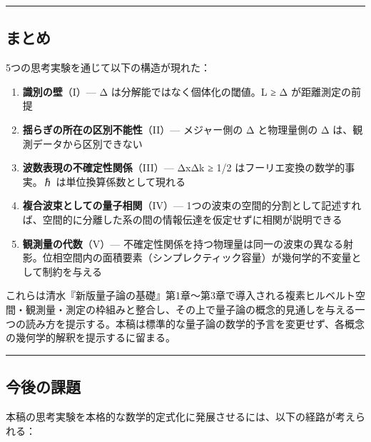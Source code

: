 \documentclass[
  11pt,
]{ltjsarticle}
\providecommand{\tightlist}{%
  \setlength{\itemsep}{0pt}\setlength{\parskip}{0pt}}
\begin{document}
\begin{center}\rule{0.5\linewidth}{0.5pt}\end{center}

\subsection{まとめ}\label{ux307eux3068ux3081}

5つの思考実験を通じて以下の構造が現れた：

\begin{enumerate}
\def\labelenumi{\arabic{enumi}.}
\tightlist
\item
  \textbf{識別の壁}（I）--- Δ は分解能ではなく個体化の閾値。L ≥ Δ
  が距離測定の前提
\item
  \textbf{揺らぎの所在の区別不能性}（II）--- メジャー側の Δ と物理量側の
  Δ は、観測データから区別できない
\item
  \textbf{波数表現の不確定性関係}（III）--- ΔxΔk ≥ 1/2
  はフーリエ変換の数学的事実。ℏ は単位換算係数として現れる
\item
  \textbf{複合波束としての量子相関}（IV）---
  1つの波束の空間的分割として記述すれば、空間的に分離した系の間の情報伝達を仮定せずに相関が説明できる
\item
  \textbf{観測量の代数}（V）---
  不確定性関係を持つ物理量は同一の波束の異なる射影。位相空間内の面積要素（シンプレクティック容量）が幾何学的不変量として制約を与える
\end{enumerate}

これらは清水『新版量子論の基礎』第1章〜第3章で導入される複素ヒルベルト空間・観測量・測定の枠組みと整合し、その上で量子論の概念的見通しを与える一つの読み方を提示する。本稿は標準的な量子論の数学的予言を変更せず、各概念の幾何学的解釈を提示するに留まる。

\begin{center}\rule{0.5\linewidth}{0.5pt}\end{center}

\subsection{今後の課題}\label{ux4ecaux5f8cux306eux8ab2ux984c}

本稿の思考実験を本格的な数学的定式化に発展させるには、以下の経路が考えられる：
\end{document}
